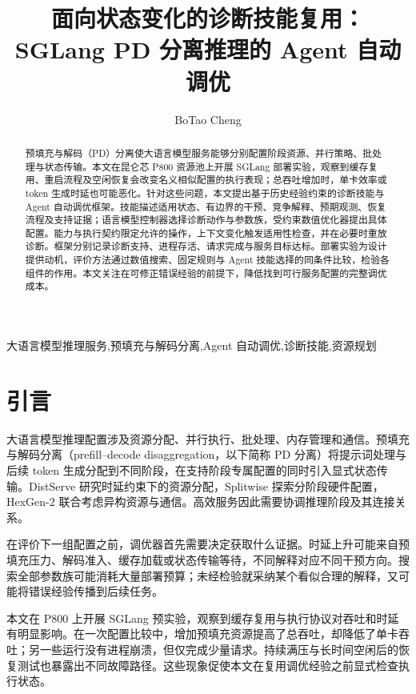 \documentclass[preprint,12pt]{elsarticle}
\begin{document}
\begin{frontmatter}
\title{面向状态变化的诊断技能复用：\\SGLang PD 分离推理的 Agent 自动调优}
\author{BoTao Cheng}
\address{Tencent}
\date{}


\begin{abstract}
预填充与解码（PD）分离使大语言模型服务能够分别配置阶段资源、并行策略、批处理与状态传输。本文在昆仑芯 P800 资源池上开展 SGLang 部署实验，观察到缓存复用、重启流程及空闲恢复会改变名义相似配置的执行表现；总吞吐增加时，单卡效率或 token 生成时延也可能恶化。针对这些问题，本文提出基于历史经验约束的诊断技能与 Agent 自动调优框架。技能描述适用状态、有边界的干预、竞争解释、预期观测、恢复流程及支持证据；语言模型控制器选择诊断动作与参数族，受约束数值优化器提出具体配置。能力与执行契约限定允许的操作，上下文变化触发适用性检查，并在必要时重放诊断。框架分别记录诊断支持、进程存活、请求完成与服务目标达标。部署实验为设计提供动机，评价方法通过数值搜索、固定规则与 Agent 技能选择的同条件比较，检验各组件的作用。本文关注在可修正错误经验的前提下，降低找到可行服务配置的完整调优成本。

\end{abstract}

\begin{keyword}
大语言模型推理服务\sep 预填充与解码分离\sep Agent 自动调优\sep 诊断技能\sep 资源规划
\end{keyword}
\end{frontmatter}

\section{引言}
大语言模型推理配置涉及资源分配、并行执行、批处理、内存管理和通信。预填充与解码分离（prefill--decode disaggregation，以下简称 PD 分离）将提示词处理与后续 token 生成分配到不同阶段，在支持阶段专属配置的同时引入显式状态传输。DistServe 研究时延约束下的资源分配，Splitwise 探索分阶段硬件配置，HexGen-2 联合考虑异构资源与通信\cite{distserve2024,splitwise2024,hexgen2025}。高效服务因此需要协调推理阶段及其连接关系。

在评价下一组配置之前，调优器首先需要决定获取什么证据。时延上升可能来自预填充压力、解码准入、缓存加载或状态传输等待，不同解释对应不同干预方向。搜索全部参数族可能消耗大量部署预算；未经检验就采纳某个看似合理的解释，又可能将错误经验传播到后续任务。

本文在 P800 上开展 SGLang 预实验，观察到缓存复用与执行协议对吞吐和时延有明显影响。在一次配置比较中，增加预填充资源提高了总吞吐，却降低了单卡吞吐；另一些运行没有进程崩溃，但仅完成少量请求。持续满压与长时间空闲后的恢复测试也暴露出不同故障路径。这些现象促使本文在复用调优经验之前显式检查执行状态。
\end{document}
